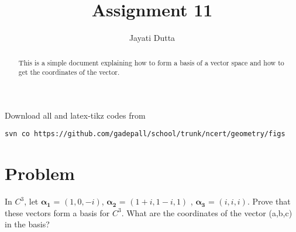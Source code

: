 \documentclass[journal,12pt,twocolumn]{IEEEtran}
\begin{document}
\let\StandardTheFigure\thefigure
\let\vec\mathbf
\renewcommand{\thefigure}{\theproblem}



\def\putbox#1#2#3{\makebox[0in][l]{\makebox[#1][l]{}\raisebox{\baselineskip}[0in][0in]{\raisebox{#2}[0in][0in]{#3}}}}
     \def\rightbox#1{\makebox[0in][r]{#1}}
     \def\centbox#1{\makebox[0in]{#1}}
     \def\topbox#1{\raisebox{-\baselineskip}[0in][0in]{#1}}
     \def\midbox#1{\raisebox{-0.5\baselineskip}[0in][0in]{#1}}

\vspace{3cm}


\title{Assignment 11}
\author{Jayati Dutta}





\maketitle

\newpage


\bigskip

\renewcommand{\thefigure}{\theenumi}
\renewcommand{\thetable}{\theenumi}


\begin{abstract}
This is a simple document explaining how to form a basis of a vector space and how to get the coordinates of the vector.
\end{abstract}

%

Download all and latex-tikz codes from 
%
\begin{lstlisting}
svn co https://github.com/gadepall/school/trunk/ncert/geometry/figs
\end{lstlisting}
%


\section{Problem}
In $C^3$, let $\vec{\alpha_1}$ = $(1,0,-i)$, $\vec{\alpha_2}$ = $(1+i,1-i,1)$ , $\vec{\alpha_3}$ = $(i,i,i)$. Prove that these vectors form a basis for $C^3$. What are the coordinates of the vector (a,b,c) in the basis?
\end{document}
